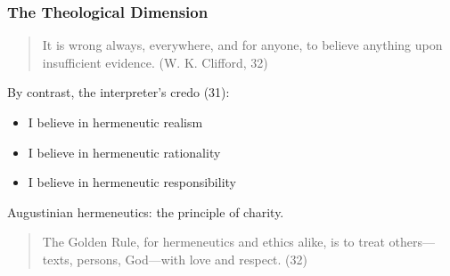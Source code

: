 \documentclass[xcolor=dvipsnames]{beamer}
\begin{document}
\begin{frame}
  \frametitle{The Theological Dimension}
  \begin{quote}
    It is wrong always, everywhere, and for anyone, to believe anything upon insufficient evidence. (W. K. Clifford, 32)
  \end{quote}
  By contrast, the interpreter's credo (31):
  \begin{itemize}
        \item I believe in hermeneutic realism
        \item I believe in hermeneutic rationality
        \item I believe in hermeneutic responsibility
  \end{itemize}
Augustinian hermeneutics: the principle of charity.
\begin{quote}
  The Golden Rule, for hermeneutics and ethics alike, is to treat others---texts, persons, God---with love and respect. (32)
\end{quote}
\end{frame}
\end{document}
